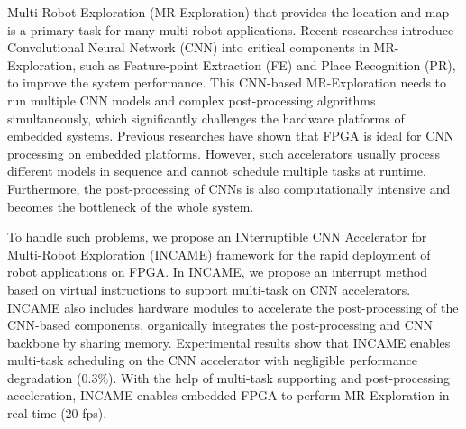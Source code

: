 
Multi-Robot Exploration (MR-Exploration) that provides the location and map is a primary task for many multi-robot applications. Recent researches introduce Convolutional Neural Network (CNN) into critical components in MR-Exploration, such as Feature-point Extraction (FE) and Place Recognition (PR), to improve the system performance. This CNN-based MR-Exploration needs to run multiple CNN models and complex post-processing algorithms simultaneously, which significantly challenges the hardware platforms of embedded systems.
Previous researches have shown that FPGA is ideal for CNN processing on embedded platforms. However, such accelerators usually process different models in sequence and cannot schedule multiple tasks at runtime. Furthermore, the post-processing of CNNs is also computationally intensive and becomes the bottleneck of the whole system.

To handle such problems, we propose an INterruptible CNN Accelerator for Multi-Robot Exploration (INCAME) framework for the rapid deployment of robot applications on FPGA. In INCAME, we propose an interrupt method based on virtual instructions to support multi-task on CNN accelerators. INCAME also includes hardware modules to accelerate the post-processing of the CNN-based components, organically integrates the post-processing and CNN backbone by sharing memory.
Experimental results show that INCAME enables multi-task scheduling on the CNN accelerator with negligible performance degradation (0.3\%). With the help of multi-task supporting and post-processing acceleration, INCAME enables embedded FPGA to perform MR-Exploration in real time (20 fps).


